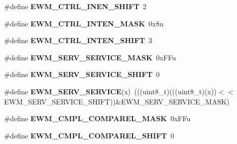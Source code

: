 \begin{DoxyCompactItemize}
\item 
\#define {\bfseries E\+W\+M\+\_\+\+C\+T\+R\+L\+\_\+\+I\+N\+E\+N\+\_\+\+S\+H\+I\+FT}~2\hypertarget{group__EWM__Register__Masks_ga64cbcf45aac428b81d2ed6aab3cd0fe2}{}\label{group__EWM__Register__Masks_ga64cbcf45aac428b81d2ed6aab3cd0fe2}

\item 
\#define {\bfseries E\+W\+M\+\_\+\+C\+T\+R\+L\+\_\+\+I\+N\+T\+E\+N\+\_\+\+M\+A\+SK}~0x8u\hypertarget{group__EWM__Register__Masks_gab5aba63161ed0c5524fff6007d84f06b}{}\label{group__EWM__Register__Masks_gab5aba63161ed0c5524fff6007d84f06b}

\item 
\#define {\bfseries E\+W\+M\+\_\+\+C\+T\+R\+L\+\_\+\+I\+N\+T\+E\+N\+\_\+\+S\+H\+I\+FT}~3\hypertarget{group__EWM__Register__Masks_gae89666da54b9dba35d0ac6e74542413d}{}\label{group__EWM__Register__Masks_gae89666da54b9dba35d0ac6e74542413d}

\item 
\#define {\bfseries E\+W\+M\+\_\+\+S\+E\+R\+V\+\_\+\+S\+E\+R\+V\+I\+C\+E\+\_\+\+M\+A\+SK}~0x\+F\+Fu\hypertarget{group__EWM__Register__Masks_ga45e5d6d64deeb807800e044bb82f318f}{}\label{group__EWM__Register__Masks_ga45e5d6d64deeb807800e044bb82f318f}

\item 
\#define {\bfseries E\+W\+M\+\_\+\+S\+E\+R\+V\+\_\+\+S\+E\+R\+V\+I\+C\+E\+\_\+\+S\+H\+I\+FT}~0\hypertarget{group__EWM__Register__Masks_ga4aacdb92f0d1a2edcdf651328e741c6a}{}\label{group__EWM__Register__Masks_ga4aacdb92f0d1a2edcdf651328e741c6a}

\item 
\#define {\bfseries E\+W\+M\+\_\+\+S\+E\+R\+V\+\_\+\+S\+E\+R\+V\+I\+CE}(x)~(((uint8\+\_\+t)(((uint8\+\_\+t)(x))$<$$<$E\+W\+M\+\_\+\+S\+E\+R\+V\+\_\+\+S\+E\+R\+V\+I\+C\+E\+\_\+\+S\+H\+I\+FT))\&E\+W\+M\+\_\+\+S\+E\+R\+V\+\_\+\+S\+E\+R\+V\+I\+C\+E\+\_\+\+M\+A\+SK)\hypertarget{group__EWM__Register__Masks_gae68020a38e5cb5c1b85060cdfcaad1ef}{}\label{group__EWM__Register__Masks_gae68020a38e5cb5c1b85060cdfcaad1ef}

\item 
\#define {\bfseries E\+W\+M\+\_\+\+C\+M\+P\+L\+\_\+\+C\+O\+M\+P\+A\+R\+E\+L\+\_\+\+M\+A\+SK}~0x\+F\+Fu\hypertarget{group__EWM__Register__Masks_gaed4764277fd6da7338abe074b6ca509e}{}\label{group__EWM__Register__Masks_gaed4764277fd6da7338abe074b6ca509e}

\item 
\#define {\bfseries E\+W\+M\+\_\+\+C\+M\+P\+L\+\_\+\+C\+O\+M\+P\+A\+R\+E\+L\+\_\+\+S\+H\+I\+FT}~0\hypertarget{group__EWM__Register__Masks_ga34ba2acd3dfb6ac825d6ca812b4461fd}{}\label{group__EWM__Register__Masks_ga34ba2acd3dfb6ac825d6ca812b4461fd}


\end{DoxyCompactItemize}
